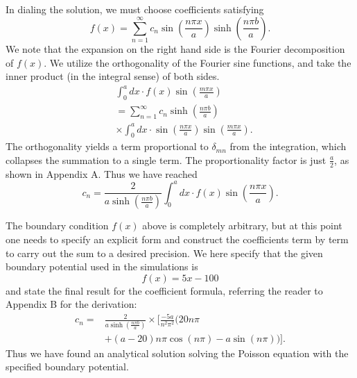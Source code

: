 \documentclass[reprint, amsmath, amssymb, aps, floatfix]{revtex4-1}
\begin{document}
In dialing the solution, we must choose coefficients satisfying \begin{equation}
f(x)=\sum_{n=1}^\infty c_n \sin\left(\frac{n\pi x}{a}\right)\sinh\left(\frac{n\pi b}{a}\right). \label{feq}\end{equation} We note that the expansion on the right hand side is the Fourier decomposition of $f(x)$. We utilize the orthogonality of the Fourier sine functions, and take the inner product (in the integral sense) of both sides. \begin{equation}
\begin{aligned}
&\int_{0}^{a}dx\cdot f(x)\sin\left(\frac{m\pi x}{a}\right)\\&= \sum_{n=1}^\infty c_n \sinh\left(\frac{n\pi b}{a}\right)\\&\times\int_0^a dx\cdot \sin\left(\frac{n\pi x}{a}\right)\sin\left(\frac{m \pi x}{a}\right).
\end{aligned}
\end{equation} The orthogonality yields a term proportional to $\delta_{mn}$ from the integration, which collapses the summation to a single term. The proportionality factor is just $\frac{a}{2}$, as shown in Appendix A. Thus we have reached \begin{equation}
c_n = \frac{2}{a\sinh\left(\frac{n\pi b}{a}\right)} \int_{0}^{a} dx\cdot f(x)\sin\left(\frac{n\pi x}{a}\right). \label{constant}
\end{equation}

The boundary condition $f(x)$ above is completely arbitrary, but at this point one needs to specify an explicit form and construct the coefficients term by term to carry out the sum to a desired precision. We here specify that the given boundary potential used in the simulations is \begin{equation}
f(x)=5x-100 \label{fofx}
\end{equation} and state the final result for the coefficient formula, referring the reader to Appendix B for the derivation: \begin{equation}
\begin{aligned}
c_n =& \frac{2}{a\sinh\left(\frac{n\pi b}{a}\right)}\times\biggl[\frac{-5a}{n^2\pi^2}\biggl(20n\pi\\
&+(a-20)n\pi\cos(n\pi)-a\sin(n\pi)\biggr)\biggr].
\label{finalceq}
\end{aligned}
\end{equation} Thus we have found an analytical solution solving the Poisson equation with the specified boundary potential.
\end{document}
